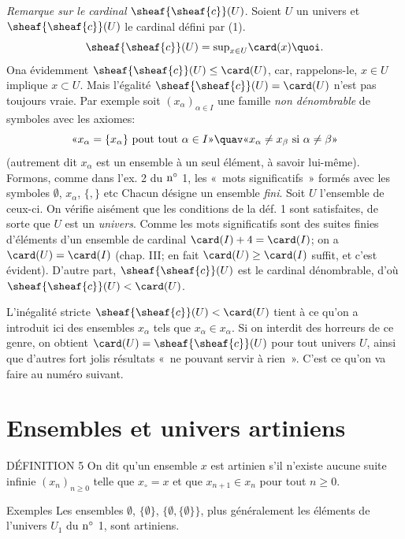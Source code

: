 \medskip
\noindent \emph{Remarque sur le cardinal} $\sheaf{\sheaf{c}}(U)$.
Soient $U$ un univers et $\sheaf{\sheaf{c}}(U)$ le cardinal défini
par (1). \ie
$$
\sheaf{\sheaf{c}}(U)={\sup}_{x\in U}\card(x){\quoi}.
$$
On\pageoriginale a évidemment $\sheaf{\sheaf{c}}(U)\leq \card(U)$,
car, rappelons-le, $x\in U$ implique $x\subset U$. Mais l'égalité
$\sheaf{\sheaf{c}}(U)=\card(U)$ n'est pas toujours vraie. Par
exemple soit $(x_{\alpha})_{\alpha\in I}$ une famille \emph{non
dénombrable} de symboles avec les axiomes:
$$
\text{«} x_{\alpha}=\{x_{\alpha}\}\mbox{ pout tout } \alpha\in I
\text{»} \quav \text{«} x_{\alpha}\neq x_{\beta}\mbox{ si }
\alpha\neq \beta \text{»}
$$
(autrement dit $x_{\alpha}$ est un ensemble à un seul élément, à
savoir lui-même). Formons, comme dans l'ex. 2 du ${\rm n^{\circ}}$
1, les  « mots significatifs » formés avec les symboles
$∅$, $x_{\alpha}$, $\{,\}$ %
etc Chacun désigne un ensemble \emph{fini}. Soit $U$ l'ensemble de
ceux-ci. On vérifie aisément que les conditions de la déf. 1 sont
satisfaites, de sorte que $U$ est un \emph{univers}. Comme les mots
significatifs sont des suites finies d'éléments d'un ensemble de
cardinal $\card(I)+4=\card(I)$; on a $\card(U)=\card(I)$ (chap. III;
en fait $\card(U)\geq \card(I)$ suffit, et c'est évident). D'autre
part, $\sheaf{\sheaf{c}}(U)$ est le cardinal dénombrable, d'où
$\sheaf{\sheaf{c}}(U)<\card(U)$.

L'inégalité stricte $\sheaf{\sheaf{c}}(U)<\card(U)$ tient à ce qu'on
a introduit ici des ensembles $x_{\alpha}$ tels que $x_{\alpha}\in
x_{\alpha}$. Si on interdit des horreurs de ce genre, on obtient
$\card(U)=\sheaf{\sheaf{c}}(U)$ pour tout univers $U$, ainsi que
d'autres fort jolis résultats « ne pouvant servir à rien ».
C'est ce qu'on va faire au numéro suivant.

\section{Ensembles et univers artiniens}

\begin{enonce*}{DÉFINITION 5}
On dit qu'un ensemble $x$ est artinien s'il n'existe aucune suite
infinie $(x_n)_{n\geq 0}$ telle que $x_{\circ}=x$ et que $x_{n+1}\in
x_n$ pour tout $n\geq 0$.
\end{enonce*}

\begin{enonce*}[remark]{Exemples}
Les ensembles $∅$, $\{∅\}$,
$\{∅,\{∅\}\}$, plus généralement les éléments de
l'univers $U_1$ du ${\rm n^{\circ}}$ 1, sont artiniens.
\end{enonce*}

